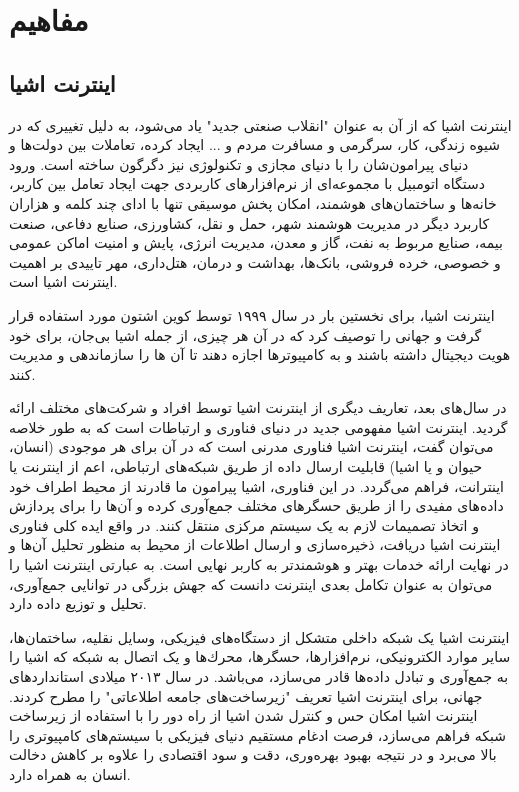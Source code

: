 \chapter{مفاهیم}
\section{اینترنت اشیا}
اینترنت اشیا که از آن به عنوان "انقلاب صنعتی جدید" یاد می‌شود، به دلیل تغییری که در شیوه
زندگی، کار، سرگرمی و مسافرت مردم و ... ایجاد کرده، تعاملات بین دولت‌ها و دنیای پیرامون‌شان را با دنیای مجازی و تكنولوژی نیز دگرگون ساخته است. ورود دستگاه اتومبیل با مجموعه‌ای از نرم‌افزارهای کاربردی جهت ایجاد تعامل بین کاربر، خانه‌ها و ساختمان‌های هوشمند، امكان پخش موسیقی تنها با ادای چند کلمه و هزاران کاربرد دیگر در مدیریت هوشمند شهر، حمل و نقل، کشاورزی، صنایع دفاعی،
صنعت بیمه، صنایع مربوط به نفت، گاز و معدن، مدیریت انرژی، پایش و امنیت اماکن عمومی و
خصوصی، خرده فروشی، بانک‌ها، بهداشت و درمان، هتل‌داری، مهر تاییدی بر اهمیت اینترنت اشیا است.


اینترنت اشیا، برای نخستین بار در سال ۱۹۹۹ توسط کوین اشتون مورد استفاده قرار گرفت و جهانی را توصیف کرد که در آن هر چیزی، از جمله اشیا بی‌جان، برای خود هویت دیجیتال داشته باشند و به کامپیوترها اجازه دهند تا آن ها را سازماندهی و مدیریت کنند.


در سال‌های بعد، تعاریف دیگری از اینترنت اشیا توسط افراد و شرکت‌های مختلف ارائه گردید. اینترنت اشیا مفهومی جدید در دنیای فناوری و ارتباطات است که به طور خلاصه می‌توان گفت، اینترنت اشیا فناوری مدرنی است که در آن برای هر موجودی (انسان، حیوان و یا اشیا) قابلیت ارسال داده از طریق شبكه‌های ارتباطی، اعم از اینترنت یا اینترانت، فراهم می‌گردد. در این فناوری، اشیا پیرامون ما قادرند از محیط اطراف خود داده‌های مفیدی را از طریق حسگرهای مختلف جمع‌آوری کرده و آن‌ها را برای پردازش و اتخاذ تصمیمات لازم به یک سیستم مرکزی منتقل کنند. در واقع ایده کلی فناوری اینترنت اشیا دریافت، ذخیره‌سازی و ارسال اطلاعات از محیط به منظور تحلیل آن‌ها و در نهایت ارائه خدمات بهتر و هوشمندتر به کاربر نهایی است. به عبارتی اینترنت اشیا را می‌توان به عنوان تكامل بعدی اینترنت دانست که جهش بزرگی در توانایی جمع‌آوری، تحلیل و توزیع داده دارد.


اینترنت اشیا یک شبكه داخلی متشکل از دستگاه‌های فیزیکی، وسایل نقلیه، ساختمان‌ها، سایر موارد الكترونیكی، نرم‌افزارها، حسگرها، محرك‌ها و یک اتصال به شبكه که اشیا را به جمع‌آوری و تبادل
داده‌ها قادر می‌سازد، می‌باشد. در سال ۲۰۱۳ میلادی استانداردهای جهانی، برای اینترنت اشیا تعریف "زیرساخت‌های جامعه اطلاعاتی" را مطرح کردند. اینترنت اشیا امكان حس و کنترل شدن اشیا از راه دور را با استفاده از زیرساخت شبكه فراهم می‌سازد، فرصت ادغام مستقیم دنیای فیزیكی با سیستم‌های کامپیوتری را بالا می‌برد و در نتیجه بهبود بهره‌وری، دقت و سود اقتصادی را علاوه بر کاهش دخالت انسان به همراه دارد.
